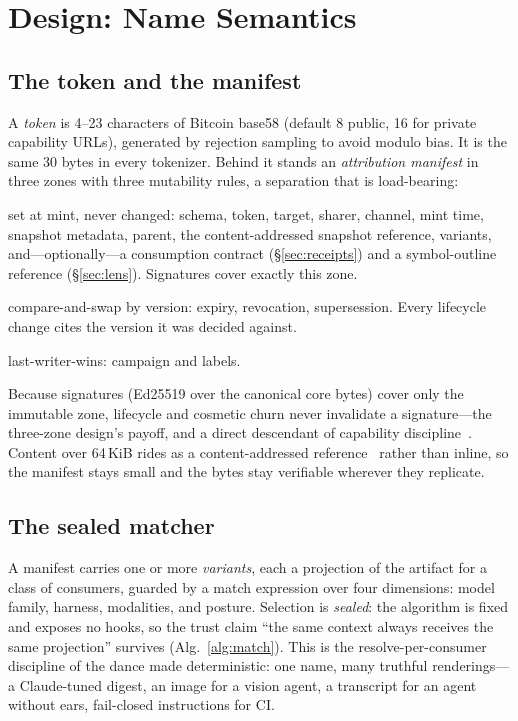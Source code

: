 \documentclass[10pt,twocolumn]{article}
\begin{document}
\section{Design: Name Semantics}
\label{sec:design}

\subsection{The token and the manifest}
A \emph{token} is 4--23 characters of Bitcoin base58 (default 8 public, 16
for private capability URLs), generated by rejection sampling to avoid
modulo bias. It is the same 30 bytes in every tokenizer. Behind it stands
an \emph{attribution manifest} in three zones with three mutability rules,
a separation that is load-bearing:

\begin{description}[leftmargin=1.1em,style=nextline]
  \item[Immutable core] set at mint, never changed: schema, token, target,
    sharer, channel, mint time, snapshot metadata, parent, the
    content-addressed snapshot reference, variants, and---optionally---a
    consumption contract (\S\ref{sec:receipts}) and a symbol-outline
    reference (\S\ref{sec:lens}). Signatures cover exactly this zone.
  \item[Versioned mutable] compare-and-swap by version: expiry,
    revocation, supersession. Every lifecycle change cites the version it
    was decided against.
  \item[Cosmetic mutable] last-writer-wins: campaign and labels.
\end{description}

Because signatures (Ed25519 over the canonical core bytes) cover only the
immutable zone, lifecycle and cosmetic churn never invalidate a
signature---the three-zone design's payoff, and a direct descendant of
capability discipline~\citep{dennis1966,miller2006}. Content over 64\,KiB
rides as a content-addressed reference~\citep{merkle1987,benet2014} rather
than inline, so the manifest stays small and the bytes stay verifiable
wherever they replicate.

\subsection{The sealed matcher}
A manifest carries one or more \emph{variants}, each a projection of the
artifact for a class of consumers, guarded by a match expression over four
dimensions: model family, harness, modalities, and posture. Selection is
\emph{sealed}: the algorithm is fixed and exposes no hooks, so the trust
claim ``the same context always receives the same projection'' survives
(Alg.~\ref{alg:match}). This is the resolve-per-consumer discipline of the
dance made deterministic: one name, many truthful renderings---a
Claude-tuned digest, an image for a vision agent, a transcript for an
agent without ears, fail-closed instructions for CI.
\end{document}
